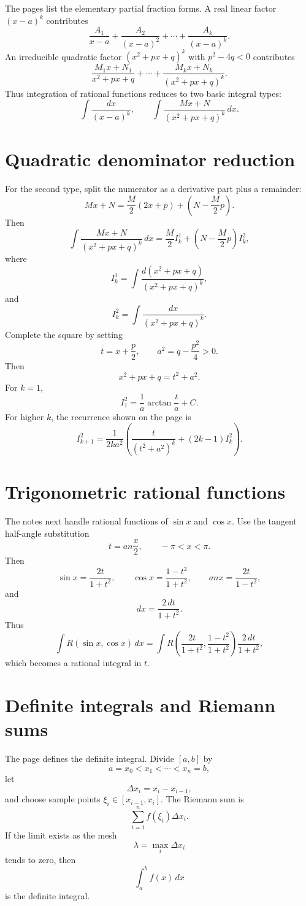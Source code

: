The pages list the elementary partial fraction forms.  A real linear factor $(x-a)^k$ contributes
\[
\frac{A_1}{x-a}+
\frac{A_2}{(x-a)^2}+\cdots+
\frac{A_k}{(x-a)^k}.
\]
An irreducible quadratic factor $(x^2+px+q)^k$ with $p^2-4q<0$ contributes
\[
\frac{M_1x+N_1}{x^2+px+q}
  +\cdots+
\frac{M_kx+N_k}{(x^2+px+q)^k}.
\]
Thus integration of rational functions reduces to two basic integral types:
\[
  \int
\frac{dx}{(x-a)^k},
  \qquad
  \int
\frac{Mx+N}{(x^2+px+q)^k}\,dx.
\]

\section{Quadratic denominator reduction}

For the second type, split the numerator as a derivative part plus a remainder:
\[
  Mx+N=
\frac M2(2x+p)+\left(N-
\frac M2p
\right).
\]
Then
\[
  \int
\frac{Mx+N}{(x^2+px+q)^k}\,dx
  =
\frac M2 I_k^1+\left(N-
\frac M2p
\right)I_k^2,
\]
where
\[
  I_k^1=\int
\frac{d(x^2+px+q)}{(x^2+px+q)^k},
\]
and
\[
  I_k^2=\int
\frac{dx}{(x^2+px+q)^k}.
\]
Complete the square by setting
\[
  t=x+
\frac p2,\qquad
  a^2=q-
\frac{p^2}{4}>0.
\]
Then
\[
  x^2+px+q=t^2+a^2.
\]
For $k=1$,
\[
  I_1^2=
\frac1a\arctan
\frac ta+C.
\]
For higher $k$, the recurrence shown on the page is
\[
  I_{k+1}^2=
\frac1{2ka^2}
  \left(
\frac{t}{(t^2+a^2)^k}+(2k-1)I_k^2
\right).
\]

\section{Trigonometric rational functions}

The notes next handle rational functions of $\sin x$ and $\cos x$.  Use the tangent half-angle substitution
\[
  t=	an
\frac x2,\qquad -\pi<x<\pi.
\]
Then
\[
  \sin x=
\frac{2t}{1+t^2},\qquad
  \cos x=
\frac{1-t^2}{1+t^2},\qquad
  	an x=
\frac{2t}{1-t^2},
\]
and
\[
  dx=
\frac{2\,dt}{1+t^2}.
\]
Thus
\[
  \int R(\sin x,\cos x)\,dx
  =
  \int R\left(
\frac{2t}{1+t^2},
\frac{1-t^2}{1+t^2}
\right)
\frac{2\,dt}{1+t^2},
\]
which becomes a rational integral in $t$.

\section{Definite integrals and Riemann sums}

The page defines the definite integral.  Divide $[a,b]$ by
\[
  a=x_0<x_1<\cdots<x_n=b,
\]
let
\[
  \Delta x_i=x_i-x_{i-1},
\]
and choose sample points $\xi_i\in[x_{i-1},x_i]$.  The Riemann sum is
\[
  \sum_{i=1}^n f(\xi_i)\Delta x_i.
\]
If the limit exists as the mesh
\[
  \lambda=\max_i\Delta x_i
\]
tends to zero, then
\[
  \int_a^b f(x)\,dx
\]
is the definite integral.

